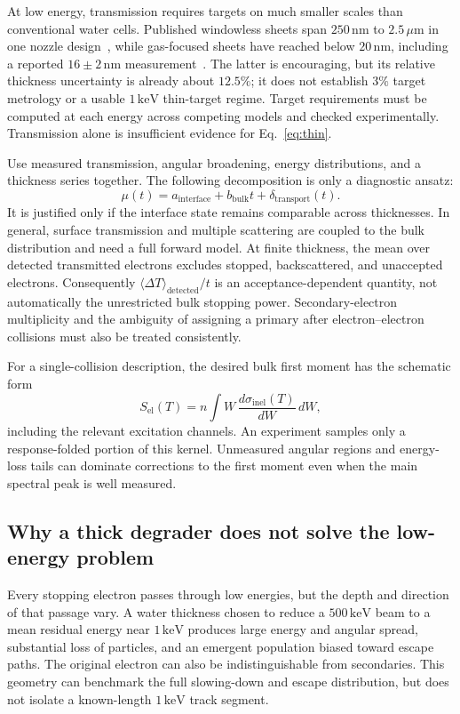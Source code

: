 \documentclass[11pt,letterpaper]{article}
\newcommand{\keV}{\,\mathrm{keV}}
\newcommand{\um}{\,\mu\mathrm{m}}
\newcommand{\nm}{\,\mathrm{nm}}
\begin{document}
At low energy, transmission requires targets on much smaller scales than conventional water cells.
Published windowless sheets span $250\nm$ to $2.5\um$ in one nozzle design~\cite{crissman}, while
gas-focused sheets have reached below $20\nm$, including a reported $16\pm2\nm$
measurement~\cite{koralek}. The latter is encouraging, but its relative thickness uncertainty is
already about $12.5\%$; it does not establish $3\%$ target metrology or a usable $1\keV$ thin-target
regime. Target requirements must be computed at each energy across competing models and checked
experimentally. Transmission alone is insufficient evidence for Eq.~\ref{eq:thin}.

Use measured transmission, angular broadening, energy distributions, and a thickness series together.
The following decomposition is only a diagnostic ansatz:
\begin{equation}
  \mu(t)=a_{\mathrm{interface}}+b_{\mathrm{bulk}}t+\delta_{\mathrm{transport}}(t).
  \label{eq:slope}
\end{equation}
It is justified only if the interface state remains comparable across thicknesses. In general,
surface transmission and multiple scattering are coupled to the bulk distribution and need a full
forward model. At finite thickness, the mean over detected transmitted electrons excludes stopped,
backscattered, and unaccepted electrons. Consequently
$\langle\Delta T\rangle_{\mathrm{detected}}/t$ is an acceptance-dependent quantity, not automatically
the unrestricted bulk stopping power. Secondary-electron multiplicity and the ambiguity of assigning
a primary after electron--electron collisions must also be treated consistently.

For a single-collision description, the desired bulk first moment has the schematic form
\begin{equation}
  S_{\mathrm{el}}(T)=n\!\int W\,
  \frac{d\sigma_{\mathrm{inel}}(T)}{dW}\,dW,
\end{equation}
including the relevant excitation channels. An experiment samples only a response-folded portion
of this kernel. Unmeasured angular regions and energy-loss tails can dominate corrections to the
first moment even when the main spectral peak is well measured.

\subsection{Why a thick degrader does not solve the low-energy problem}

Every stopping electron passes through low energies, but the depth and direction of that passage vary.
A water thickness chosen to reduce a $500\keV$ beam to a mean residual energy near $1\keV$ produces
large energy and angular spread, substantial loss of particles, and an emergent population biased
toward escape paths. The original electron can also be indistinguishable from secondaries. This
geometry can benchmark the full slowing-down and escape distribution, but does not isolate a
known-length $1\keV$ track segment.
\end{document}

